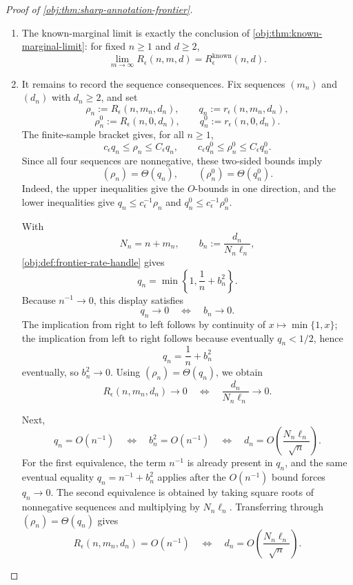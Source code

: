 \documentclass[11pt]{article}
\begin{document}
\begin{proof}[Proof of \cref{obj:thm:sharp-annotation-frontier}]
\begin{enumerate}
\item The known-marginal limit is exactly the conclusion of \cref{obj:thm:known-marginal-limit}: for fixed \(n\ge1\) and \(d\ge2\),
\[
\lim_{m\to\infty} R_\epsilon(n,m,d)
=
R_\epsilon^{\mathrm{known}}(n,d).
\]

\item It remains to record the sequence consequences.  Fix sequences \((m_n)\) and \((d_n)\) with \(d_n\ge2\), and set
\[
\rho_n:=R_\epsilon(n,m_n,d_n),\qquad
q_n:=r_\epsilon(n,m_n,d_n),
\]
\[
\rho_n^{0}:=R_\epsilon(n,0,d_n),\qquad
q_n^{0}:=r_\epsilon(n,0,d_n).
\]
The finite-sample bracket gives, for all \(n\ge1\),
\[
c_\epsilon q_n\le \rho_n\le C_\epsilon q_n,
\qquad
c_\epsilon q_n^{0}\le \rho_n^{0}\le C_\epsilon q_n^{0}.
\]
Since all four sequences are nonnegative, these two-sided bounds imply
\[
(\rho_n)=\Theta(q_n),
\qquad
(\rho_n^{0})=\Theta(q_n^{0}).
\]
Indeed, the upper inequalities give the \(O\)-bounds in one direction, and the lower inequalities give
\(q_n\le c_\epsilon^{-1}\rho_n\) and
\(q_n^{0}\le c_\epsilon^{-1}\rho_n^{0}\). %

With
\[
N_n=n+m_n,\qquad
b_n:=\frac{d_n}{N_n\ell_n},
\]
\cref{obj:def:frontier-rate-handle} gives
\[
q_n=\min\left\{1,\frac1n+b_n^2\right\}.
\]
Because \(n^{-1}\to0\), this display satisfies
\[
q_n\to0
\quad\Longleftrightarrow\quad
b_n\to0.
\]
The implication from right to left follows by continuity of \(x\mapsto\min\{1,x\}\); the implication from left to right follows because eventually \(q_n<1/2\), hence
\[
q_n=\frac1n+b_n^2
\]
eventually, so \(b_n^2\to0\).  Using \((\rho_n)=\Theta(q_n)\), we obtain
\[
R_\epsilon(n,m_n,d_n)\to0
\quad\Longleftrightarrow\quad
\frac{d_n}{N_n\ell_n}\to0.
\]

Next,
\[
q_n=O(n^{-1})
\quad\Longleftrightarrow\quad
b_n^2=O(n^{-1})
\quad\Longleftrightarrow\quad
d_n=O\!\left(\frac{N_n\ell_n}{\sqrt n}\right).
\]
For the first equivalence, the term \(n^{-1}\) is already present in \(q_n\), and the same eventual equality
\(q_n=n^{-1}+b_n^2\) applies after the \(O(n^{-1})\) bound forces \(q_n\to0\).  The second equivalence is obtained by taking square roots of nonnegative sequences and multiplying by \(N_n\ell_n\).  Transferring through \((\rho_n)=\Theta(q_n)\) gives
\[
R_\epsilon(n,m_n,d_n)=O(n^{-1})
\quad\Longleftrightarrow\quad
d_n=O\!\left(\frac{N_n\ell_n}{\sqrt n}\right).
\]


\end{enumerate}
\end{proof}
\end{document}
